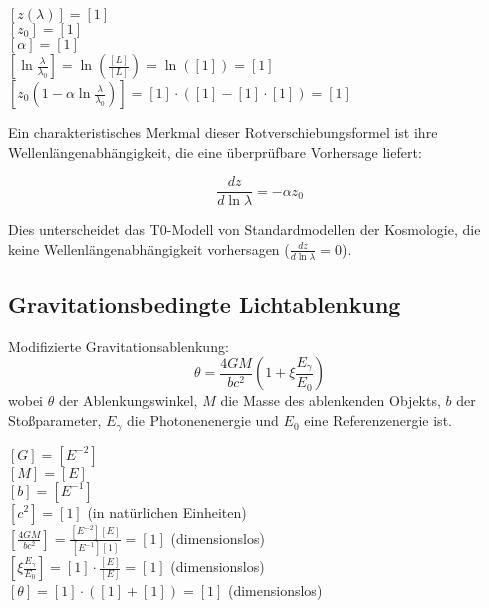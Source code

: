 \documentclass[12pt,a4paper]{article}
\theoremstyle{definition}
\begin{document}
	\begin{dimanalysis}
		$[z(\lambda)] = [1]$\\
		$[z_0] = [1]$\\
		$[\alpha] = [1]$\\
		$\left[\ln\frac{\lambda}{\lambda_0}\right] = \ln\left(\frac{[L]}{[L]}\right) = \ln([1]) = [1]$\\
		$\left[z_0\left(1 - \alpha \ln\frac{\lambda}{\lambda_0}\right)\right] = [1] \cdot ([1] - [1] \cdot [1]) = [1]$ \checkmark
	\end{dimanalysis}
	
	Ein charakteristisches Merkmal dieser Rotverschiebungsformel ist ihre Wellenlängenabhängigkeit, die eine überprüfbare Vorhersage liefert:
	
	\begin{equation}
		\frac{dz}{d\ln\lambda} = -\alpha z_0
	\end{equation}
	
	Dies unterscheidet das T0-Modell von Standardmodellen der Kosmologie, die keine Wellenlängenabhängigkeit vorhersagen ($\frac{dz}{d\ln\lambda} = 0$).
	
	\subsection{Gravitationsbedingte Lichtablenkung}
	
	\begin{formel}
		Modifizierte Gravitationsablenkung:
		\begin{equation}
			\boxed{\theta = \frac{4GM}{bc^2}\left(1 + \xi \frac{E_\gamma}{E_0}\right)}
		\end{equation}
		wobei $\theta$ der Ablenkungswinkel, $M$ die Masse des ablenkenden Objekts, $b$ der Stoßparameter, $E_\gamma$ die Photonenenergie und $E_0$ eine Referenzenergie ist.
	\end{formel}
	
	\begin{dimanalysis}
		$[G] = [E^{-2}]$\\
		$[M] = [E]$\\
		$[b] = [E^{-1}]$\\
		$[c^2] = [1]$ (in natürlichen Einheiten)\\
		$\left[\frac{4GM}{bc^2}\right] = \frac{[E^{-2}][E]}{[E^{-1}][1]} = [1]$ (dimensionslos)\\
		$\left[\xi \frac{E_\gamma}{E_0}\right] = [1] \cdot \frac{[E]}{[E]} = [1]$ (dimensionslos)\\
		$[\theta] = [1] \cdot ([1] + [1]) = [1]$ (dimensionslos) \checkmark
	\end{dimanalysis}
	
\end{document}
